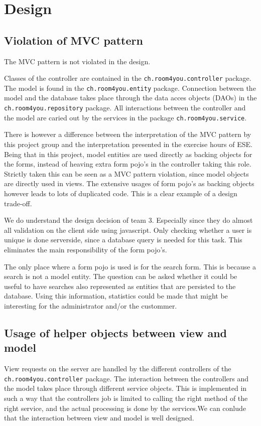 \documentclass[a4wide]{article}
\title{}
\author{}
\begin{document}

\tableofcontents
\clearpage
\section{Design}
\subsection{Violation of MVC pattern}
The MVC pattern is not violated in the design. 

Classes of the controller are contained in the \texttt{ch.room4you.controller} package. The model is found in the \texttt{ch.room4you.entity} package. Connection between the model and the database takes place through the data acces objects (DAOs) in the \texttt{ch.room4you.repository} package. All interactions between the controller and the model are caried out by the services in the package \texttt{ch.room4you.service}.
 
There is however a difference between the interpretation of the MVC pattern by this project group and the interpretation presented in the exercise hours of ESE. Being that in this project, model entities are used directly as backing objects for the forms, instead of heaving extra form pojo's in the controller taking this role. Strictly taken this can be seen as a MVC pattern violation, since model objects are directly used in views. The extensive usages of form pojo's as backing objects however leads to lots of duplicated code. This is a clear example of a design trade-off. 

We do understand the design decision of team 3. Especially since they do almost all validation on the client side using javascript. Only checking whether a user is unique is done serverside, since a database query is needed for this task. This eliminates the main responsibility of the form pojo's. 

The only place where a form pojo  is used is for the search form. This is because a search is not a model entity. The question can be asked whether it could be useful to have searches also represented as entities that are persisted to the database. Using this information, statistics could be made that might be interesting for the administrator and/or the custommer. 
\subsection{Usage of helper objects between view and model}
View requests on the server are handled by the different controllers of the \texttt{ch.room4you.controller} package. The interaction between the controllers and the model takes place through different service objects. This is implemented in such a way that the controllers job is limited to calling the right method of the right service, and the actual processing is done by the services.We can conlude that the interaction between view and model is well designed.
\end{document}
